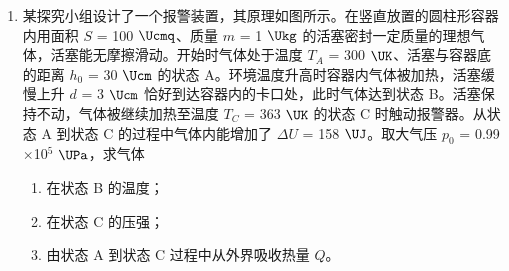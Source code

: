 \documentclass[\gkver]{gaokaozhenti}
\begin{document}
\begin{enumerate}
\item
某探究小组设计了一个报警装置，其原理如图所示。在竖直放置的圆柱形容器内用面积 $S$ = 100 $\Ucmq$、质量 $m$ = 1 $\Ukg$ 的活塞密封一定质量的理想气体，活塞能无摩擦滑动。开始时气体处于温度 $T_{A}$ = 300 $\UK$、活塞与容器底的距离 $h_{0}$ = 30 $\Ucm$ 的状态 A。环境温度升高时容器内气体被加热，活塞缓慢上升 $d$ = 3 $\Ucm$ 恰好到达容器内的卡口处，此时气体达到状态 B。活塞保持不动，气体被继续加热至温度 $T_{C}$ = 363 $\UK$ 的状态 C 时触动报警器。从状态 A 到状态 C 的过程中气体内能增加了 $\Delta U$ = 158 $\UJ$。取大气压 $p_{0}$ = 0.99$\times$10$^{5}$ $\UPa$，求气体
\begin{enumerate}
	\item
	在状态 B 的温度；
	\item
	在状态 C 的压强；
	\item
	由状态 A 到状态 C 过程中从外界吸收热量 $Q$。
\end{enumerate}
\end{enumerate}
\end{document}
